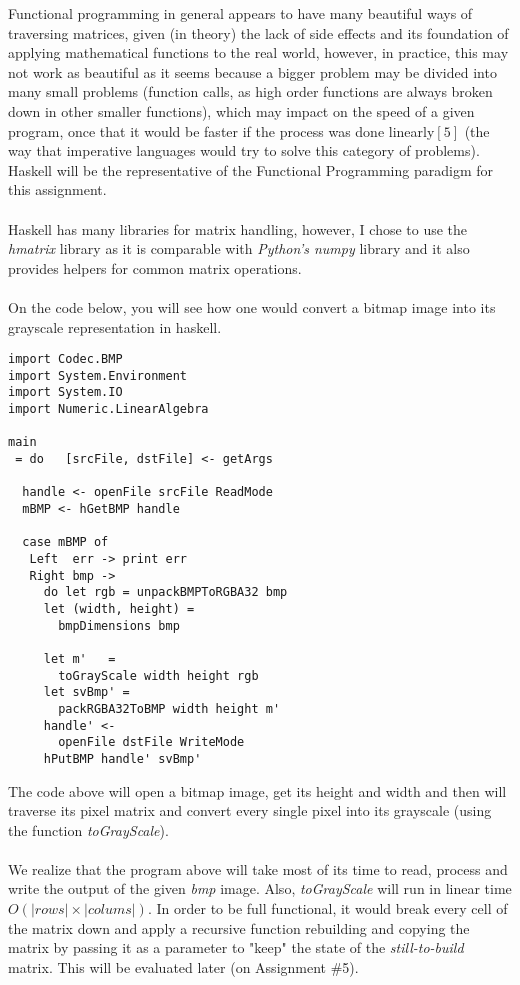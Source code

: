 \documentclass[conference]{IEEEtran}
\begin{document}
Functional programming in general appears to have many beautiful ways of traversing matrices, given (in theory) the lack of side effects and its foundation of applying mathematical functions to the real world, however, in practice, this may not work as beautiful as it seems because a bigger problem may be divided into many small problems (function calls, as high order functions are always broken down in other smaller functions), which may impact on the speed of a given program, once that it would be faster if the process was done linearly$[5]$ (the way that imperative languages would try to solve this category of problems). Haskell will be the representative of the Functional Programming paradigm for this assignment.
\\\\
Haskell has many libraries for matrix handling, however, I chose to use the \textit{hmatrix} library as it is comparable with \textit{Python's numpy} library and it also provides helpers for common matrix operations.
\\\\
On the code below, you will see how one would convert a bitmap image into its grayscale representation in haskell.

\lstset{language=haskell}
\begin{lstlisting}[frame=single]
import Codec.BMP
import System.Environment
import System.IO
import Numeric.LinearAlgebra

main
 = do	[srcFile, dstFile] <- getArgs

  handle <- openFile srcFile ReadMode
  mBMP <- hGetBMP handle
  
  case mBMP of
   Left  err -> print err
   Right bmp ->
     do let rgb = unpackBMPToRGBA32 bmp
	 let (width, height) =
	   bmpDimensions bmp
	
	 let m'   =
	   toGrayScale width height rgb
	 let svBmp' =
	   packRGBA32ToBMP width height m'
	 handle' <-
	   openFile dstFile WriteMode
	 hPutBMP handle' svBmp'
\end{lstlisting}

The code above will open a bitmap image, get its height and width and then will traverse its pixel matrix and convert every single pixel into its grayscale (using the function \textit{toGrayScale}).
\\\\
We realize that the program above will take most of its time to read, process and write the output of the given \textit{bmp} image. Also, \textit{toGrayScale} will run in linear time $O(|rows| \times |colums|)$. In order to be full functional, it would break every cell of the matrix down and apply a recursive function rebuilding and copying the matrix by passing it as a parameter to "keep" the state of the \textit{still-to-build} matrix. This will be evaluated later (on Assignment \#5).
\end{document}

